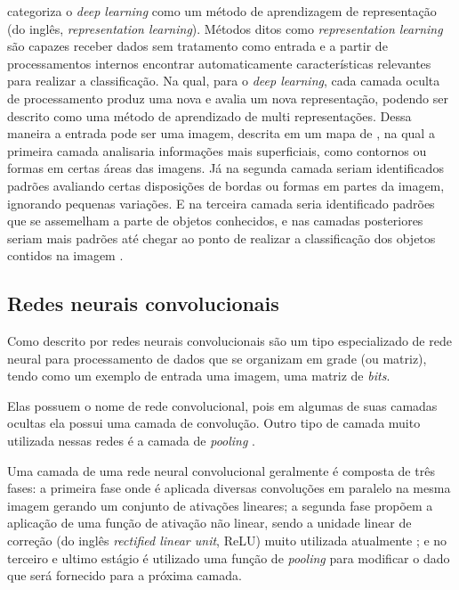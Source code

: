 \par {} categoriza o \textit{deep learning} como um método de aprendizagem de representação (do inglês, \textit{representation learning}). Métodos ditos como \textit{representation learning} são capazes receber dados sem tratamento como entrada e a partir de processamentos internos encontrar automaticamente características relevantes para realizar a classificação. Na qual, para o \textit{deep learning}, cada camada oculta de processamento produz uma nova e avalia um nova representação, podendo ser descrito como uma método de aprendizado de multi representações. Dessa maneira a entrada pode ser uma imagem, descrita em um mapa de , na qual a primeira camada analisaria informações mais superficiais, como contornos ou formas em certas áreas das imagens. Já na segunda camada seriam identificados padrões avaliando certas disposições de bordas ou formas em partes da imagem, ignorando pequenas variações. E na terceira camada seria identificado padrões que se assemelham a parte de objetos conhecidos, e nas camadas posteriores seriam mais padrões até chegar ao ponto de realizar a classificação dos objetos contidos na imagem \cite{lecun2015deep}.

\subsection{Redes neurais convolucionais}
Como descrito por  redes neurais convolucionais são um tipo especializado de rede neural para processamento de dados que se organizam em grade (ou matriz), tendo como um exemplo de entrada uma imagem, uma matriz de \textit{bits}.
\par Elas possuem o nome de rede convolucional, pois em algumas de suas camadas ocultas ela possui uma camada de convolução. Outro tipo de camada muito utilizada nessas redes é a camada de \textit{pooling} \cite{Goodfellow-et-al-2016}.
\par Uma camada de uma rede neural convolucional geralmente é composta de três fases: a primeira fase onde é aplicada diversas convoluções em paralelo na mesma imagem gerando um conjunto de ativações lineares; a segunda fase propõem a aplicação de uma função de ativação não linear, sendo a unidade linear de correção (do inglês \textit{rectified linear unit}, ReLU) muito utilizada atualmente \cite{lecun2015deep}; e no terceiro e ultimo estágio é utilizado uma função de \textit{pooling} para modificar o dado que será fornecido para a próxima camada.  

